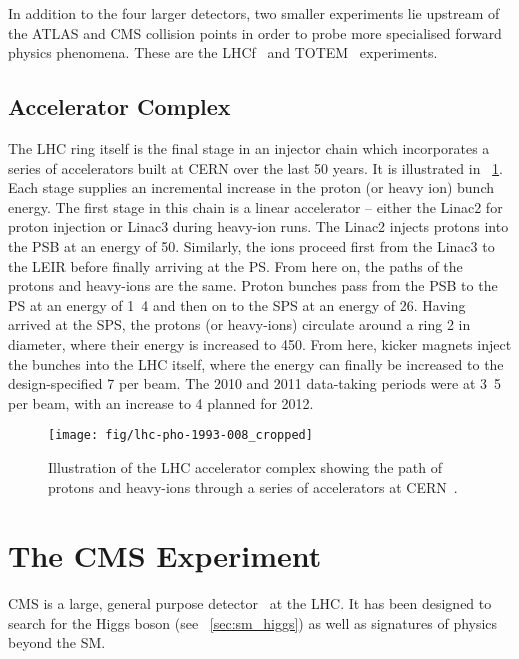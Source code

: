 In addition to the four larger detectors, two smaller experiments lie upstream
of the \ac{ATLAS} and \ac{CMS} collision points in order to probe more
specialised forward physics phenomena. These are the
\ac{LHCf}~\cite{lhcf_proposal} and \ac{TOTEM}~\cite{totem_proposal} experiments.

\subsection{Accelerator Complex}
The \ac{LHC} ring itself is the final stage in an injector chain which
incorporates a series of accelerators built at CERN over the last 50 years. It
is illustrated in \fig~\ref{fig:expt_lhc}. Each stage supplies an incremental
increase in the proton (or heavy ion) bunch energy. The first stage in this
chain is a linear accelerator -- either the Linac2 for proton injection or
Linac3 during heavy-ion runs. The Linac2 injects protons into the \ac{PSB} at an
energy of \unit{50}{\mega\electronvolt}. Similarly, the ions proceed first from
the Linac3 to the \ac{LEIR} before finally arriving at the \ac{PS}. From here
on, the paths of the protons and heavy-ions are the same. Proton bunches pass
from the \ac{PSB} to the \ac{PS} at an energy of \unit{1.4}{\giga\electronvolt}
and then on to the \ac{SPS} at an energy of
\unit{26}{\giga\electronvolt}. Having arrived at the \ac{SPS}, the protons (or
heavy-ions) circulate around a ring \unit{2}{\kilo\metre} in diameter, where
their energy is increased to \unit{450}{\giga\electronvolt}. From here, kicker
magnets inject the bunches into the \ac{LHC} itself, where the energy can
finally be increased to the design-specified \unit{7}{\TeV} per beam. The 2010
and 2011 data-taking periods were at \unit{3.5}{\TeV} per beam, with an increase
to \unit{4}{\TeV} planned for 2012.

\begin{figure}[h!]
\texttt{[image: fig/lhc-pho-1993-008\_cropped]}
\caption[Illustration of the \acs{LHC} accelerator complex]{Illustration of the
  \ac{LHC} accelerator complex showing the path of protons and heavy-ions
  through a series of accelerators at \ac{CERN}~\cite{lhc_injection}.}
\label{fig:expt_lhc}
\end{figure}

\section{The \acl{CMS} Experiment}
\label{sec:cms}
\ac{CMS} is a large, general purpose detector~\cite{cms_jinst} at the
\ac{LHC}. It has been designed to search for the Higgs boson (see
\sec~\ref{sec:sm_higgs}) as well as signatures of physics beyond the \ac{SM}.

